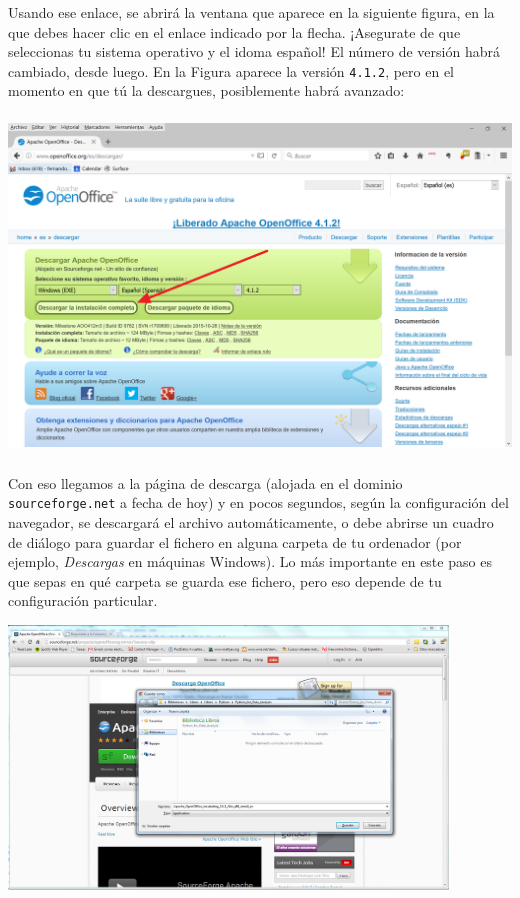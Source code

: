\documentclass[10pt,a4paper]{article}\usepackage[]{graphicx}\usepackage[]{color}
\begin{document}
Usando ese enlace, se abrirá la ventana que aparece en la siguiente figura, en la que debes hacer
clic en el enlace indicado por la flecha. ¡Asegurate de que seleccionas tu sistema operativo y el idoma español! El número de versión habrá cambiado, desde luego. En la
Figura aparece la versión {\tt 4.1.2}, pero en el momento en que tú la descargues, posiblemente habrá avanzado:
    \begin{center}
    \includegraphics[height=9cm]{../fig/Tut00-WebOpenOffice-02-201605.png}
    \end{center}

Con eso llegamos a la página de descarga (alojada en el dominio {\tt sourceforge.net} a fecha de
hoy) y en pocos segundos, según la configuración del navegador, se descargará el archivo
automáticamente, o debe abrirse un cuadro de diálogo para guardar el fichero en alguna carpeta de
tu ordenador (por ejemplo, {\em Descargas} en máquinas Windows). Lo más importante en este paso es
que sepas en qué carpeta se guarda ese fichero, pero eso depende de tu configuración particular.

    \begin{center}
    \includegraphics[height=7cm]{../fig/Tut00-WebOpenOffice-02.png}
    \end{center}
\end{document}
